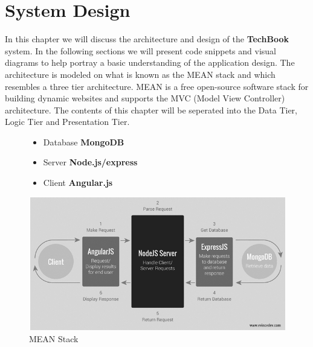 \chapter{System Design}
In this chapter we will discuss the architecture and design of the \textbf{TechBook} system. In the following sections we will present code snippets and visual diagrams to help portray a basic understanding of the application design. The architecture is modeled on what is known as the MEAN stack and which resembles a three tier architecture. MEAN is a free open-source software stack for building dynamic websites and supports the MVC (Model View Controller) architecture. The contents of this chapter will be seperated into the Data Tier, Logic Tier and Presentation Tier.




\begin{figure}[H]
\begin{minipage}{.4\textwidth}  %
\lstset{linewidth = 4cm, breaklines=true} %
\begin{itemize}
\item Database \textbf{MongoDB}
\item Server \textbf{Node.js/express}
\item Client \textbf{Angular.js}
\end{itemize}

\end{minipage}
\qquad %
\begin{minipage}{0.6\textwidth} %
\includegraphics[scale=.4]{img/mvc.png} %
\caption{MEAN Stack}
\end{minipage}
\end{figure}

